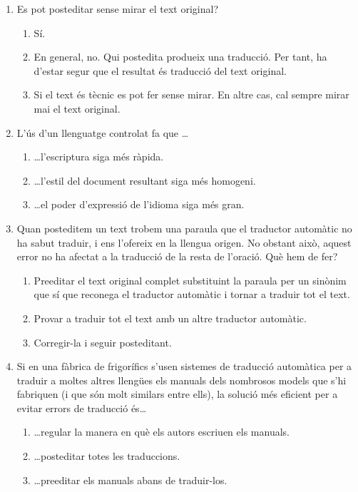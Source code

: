 \begin{enumerate}
\item Es pot posteditar sense mirar el text original?
  \begin{enumerate}
  \item Sí.
  \item En general, no. Qui postedita produeix una traducció. Per
    tant, ha d'estar segur que el resultat és traducció del text
    original.
  \item Si el text és tècnic es pot fer sense mirar. En altre cas, cal
    sempre mirar mai el text original.
  \end{enumerate}

\item L'ús d'un llenguatge controlat fa que \ldots
  \begin{enumerate}
  \item \ldots l'escriptura siga més ràpida.
  \item \ldots l'estil del document resultant siga més homogeni.
  \item \ldots el poder d'expressió de l'idioma siga més gran.
  \end{enumerate}

\item Quan posteditem un text trobem una paraula que el traductor
  automàtic no ha sabut traduir, i ens l'ofereix en la llengua
  origen. No obstant això, aquest error no ha afectat a la traducció
  de la resta de l'oració. Què hem de fer?
  \begin{enumerate}
  \item Preeditar el text original complet substituint la paraula per
    un sinònim que sí que reconega el traductor automàtic i tornar a
    traduir tot el text.
  \item Provar a traduir tot el text amb un altre traductor automàtic.
  \item Corregir-la i seguir posteditant.
  \end{enumerate}

\item Si en una fàbrica de frigorífics s'usen sistemes de traducció
  automàtica per a traduir a moltes altres llengües els manuals dels
  nombrosos models que s'hi fabriquen (i que són molt similars entre
  ells), la solució més eficient per a evitar errors de traducció
  és{\ldots}
  \begin{enumerate}
  \item \ldots regular la manera en què els autors escriuen els
    manuals.
  \item \ldots posteditar totes les traduccions.
  \item \ldots preeditar els manuals abans de traduir-los.
  \end{enumerate}


\end{enumerate}
